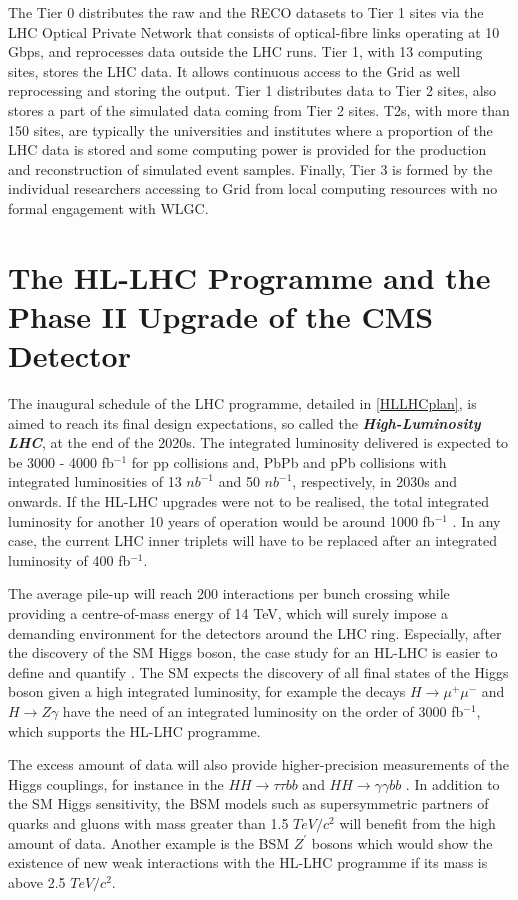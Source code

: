The Tier 0 distributes the raw and the RECO datasets to Tier 1 sites via the LHC Optical Private Network that consists of optical-fibre links operating at 10 Gbps, and reprocesses data outside the LHC runs. Tier 1, with 13 computing sites, stores the LHC data. It allows continuous access to the Grid as well reprocessing and storing the output. Tier 1 distributes data to Tier 2 sites, also stores a part of the simulated data coming from Tier 2 sites. T2s, with more than 150 sites, are typically the universities and institutes where a proportion of the LHC data is stored and some computing power is provided for the production and reconstruction of simulated event samples. Finally, Tier 3 is formed by the individual researchers accessing to Grid from local computing resources with no formal engagement with WLGC.

\section{The HL-LHC Programme and the Phase II Upgrade of the CMS Detector}

The inaugural schedule of the LHC programme, detailed in \autoref{HLLHCplan}, is aimed to reach its final design expectations, so called the \emph{\textbf{High-Luminosity LHC}}, at the end of the 2020s. The integrated luminosity delivered is expected to be 3000 - 4000 fb$^{-1}$ for pp collisions and, PbPb and pPb collisions with integrated luminosities of 13 $nb^{-1}$ and 50 $nb^{-1}$, respectively, in 2030s and onwards. If the HL-LHC upgrades were not to be realised, the total integrated luminosity for another 10 years of operation would be around 1000 fb$^{-1}$ \cite{Aleksan:1628377}. In any case, the current LHC inner triplets will have to be replaced after an integrated luminosity of 400 fb$^{-1}$.

The average pile-up will reach 200 interactions per bunch crossing while providing a centre-of-mass energy of 14 TeV, which will surely impose a demanding environment for the detectors around the LHC ring. Especially, after the discovery of the SM Higgs boson, the case study for an HL-LHC is easier to define and quantify \cite{cmsloi}. The SM expects the discovery of all final states of the Higgs boson given a high integrated luminosity, for example the decays $H\rightarrow\mu^+\mu^-$ and $H\rightarrow Z\gamma$ have the need of an integrated luminosity on the order of 3000 fb$^{-1}$, which supports the HL-LHC programme.

The excess amount of data will also provide higher-precision measurements of the Higgs couplings, for instance in the $HH\rightarrow\tau\tau bb$ and $HH\rightarrow\gamma\gamma bb$ \cite{ATLAS:1502664}. In addition to the SM Higgs sensitivity, the BSM models such as supersymmetric partners of quarks and gluons with mass greater than 1.5 $TeV/c^2$ will benefit from the high amount of data. Another example is the BSM $Z^\prime$ bosons which would show the existence of new weak interactions with the HL-LHC programme if its mass is above 2.5 $TeV/c^2$.

